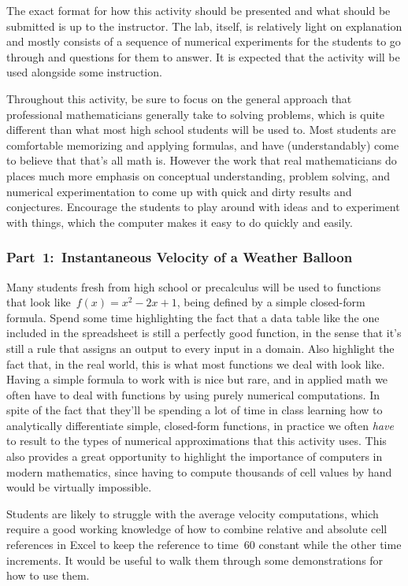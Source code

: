 The exact format for how this activity should be presented and what should be submitted is up to the instructor. The lab, itself, is relatively light on explanation and mostly consists of a sequence of numerical experiments for the students to go through and questions for them to answer. It is expected that the activity will be used alongside some instruction.

Throughout this activity, be sure to focus on the general approach that professional mathematicians generally take to solving problems, which is quite different than what most high school students will be used to. Most students are comfortable memorizing and applying formulas, and have (understandably) come to believe that that's all math is. However the work that real mathematicians do places much more emphasis on conceptual understanding, problem solving, and numerical experimentation to come up with quick and dirty results and conjectures. Encourage the students to play around with ideas and to experiment with things, which the computer makes it easy to do quickly and easily.

\subsubsection*{Part~1:~Instantaneous Velocity of a Weather Balloon}

Many students fresh from high school or precalculus will be used to functions that look like~$f(x) = x^2 - 2x + 1$, being defined by a simple closed-form formula. Spend some time highlighting the fact that a data table like the one included in the spreadsheet is still a perfectly good function, in the sense that it's still a rule that assigns an output to every input in a domain. Also highlight the fact that, in the real world, this is what most functions we deal with look like. Having a simple formula to work with is nice but rare, and in applied math we often have to deal with functions by using purely numerical computations. In spite of the fact that they'll be spending a lot of time in class learning how to analytically differentiate simple, closed-form functions, in practice we often \textit{have} to result to the types of numerical approximations that this activity uses. This also provides a great opportunity to highlight the importance of computers in modern mathematics, since having to compute thousands of cell values by hand would be virtually impossible.

Students are likely to struggle with the average velocity computations, which require a good working knowledge of how to combine relative and absolute cell references in Excel to keep the reference to time~60 constant while the other time increments. It would be useful to walk them through some demonstrations for how to use them.

